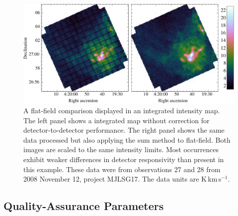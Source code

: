 \documentclass[a4paper,fleqn,usenatbib]{mnras}
\begin{document}
\begin{figure}
\includegraphics[width=\textwidth]{12CO_flat_comparison}
\caption{A flat-field comparison displayed in an integrated intensity
  map.  The left panel shows a integrated map without correction for
  detector-to-detector performance.  The right panel shows the same
  data processed but also applying the sum method to flat-field.  Both
  images are scaled to the same intensity limits.  Most occurrences
  exhibit weaker differences in detector responsivity than present in
  this example. These data were from observations 27 and 28 from 2008
  November 12, project  MJLSG17. The data units are K\,km\,s$^{-1}$.}
\label{fig:flatfield:results}
\end{figure}

\subsection{Quality-Assurance Parameters \label{sec:qa}}
\end{document}
